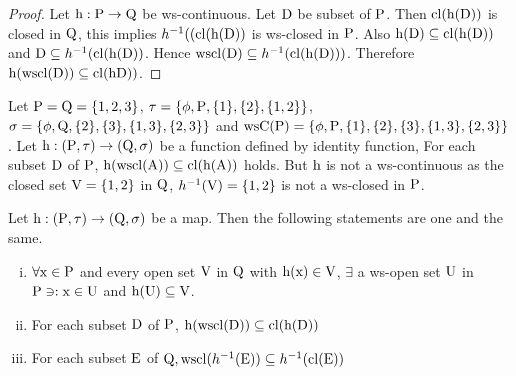\begin{proof}
Let $\mathrm{h}: \mathrm{P}\to \mathrm{Q}$ be ws-continuous. Let $\mathrm{D}$ be subset of $\mathrm{P}$. Then $\mathrm{cl}(\mathrm{h}(\mathrm{D}))$ is closed in $\mathrm{Q}$, this implies $h^{-1}((\mathrm{cl}(\mathrm{h}(\mathrm{D}))$ is ws-closed in $\mathrm{P}$. Also $\mathrm{h}(\mathrm{D})\subseteq \mathrm{cl}(\mathrm{h}(\mathrm{D}))$ and $\mathrm{D}\subseteq h^{-1}(\mathrm{cl}(\mathrm{h}(\mathrm{D}))$. Hence $\mathrm{wscl}(\mathrm{D})\subseteq h^{-1}(\mathrm{cl}(\mathrm{h}(\mathrm{D})))$. Therefore $\mathrm{h}(\mathrm{wscl}(\mathrm{D}))\subseteq \mathrm{cl}(\mathrm{h}\mathrm{D}))$.
\end{proof}

\begin{exm}\label{exam3.2.18}
Let $\mathrm{P}=\mathrm{Q}=\{1,2,3\}$, $\tau =\{\phi, \mathrm{P},\{1\},\{2\},\{1, 2\}\}$, $\sigma =\{\phi, \TSQ, \{2\},\break \{3\}, \{1, 3\}, \{2, 3\}\}$ and $\mathrm{ws}\mathrm{C}(\mathrm{P})= \{\phi, \mathrm{P}, \{1\},\{2\},\{3\}, \{1, 3\},\{2, 3\}\}$. Let $\mathrm{h}: (\mathrm{P},\tau )\to (\mathrm{Q}, \sigma)$ be a function defined by identity function, For each subset $\mathrm{D}$ of $\mathrm{P}$, $\mathrm{h}(\mathrm{wscl}(\mathrm{A}))\subseteq \mathrm{cl}(\mathrm{h}(\mathrm{A}))$ holds. But $\mathrm{h}$ is not a ws-continuous as the closed set $\mathrm{V}= \{1, 2\}$ in $\mathrm{Q}$, $h^{-1}(\mathrm{V}) = \{1, 2\}$ is not a ws-closed in $\mathrm{P}$.
\end{exm}

\begin{thm}\label{thm3.2.19}
Let $\mathrm{h}: (\mathrm{P},\tau )\to (\mathrm{Q}, \sigma)$ be a map. Then the following statements are one and the same.
\begin{enumerate}[(i)]
\item $\forall \mathrm{x}\in \mathrm{P}$ and every open set $\mathrm{V}$ in $\mathrm{Q}$ with $\mathrm{h}(\mathrm{x})\in \mathrm{V}$, $\exists$ a ws-open set $\mathrm{U}$ in $\mathrm{P}\ni: \mathrm{x}\in\mathrm{U}$ and $\mathrm{h}(\mathrm{U})\subseteq \mathrm{V}$.
\item For each subset $\mathrm{D}$ of $\mathrm{P}$, $\mathrm{h}(\mathrm{wscl}(\mathrm{D}))\subseteq \mathrm{cl}(\mathrm{h}(\mathrm{D}))$
\item For each subset $\mathrm{E}$ of $\mathrm{Q}, \mathrm{wscl}(h^{-1} (\mathrm{E})) \subseteq  h^{-1}(\mathrm{cl}(\mathrm{E}))$
\end{enumerate}
\end{thm}


